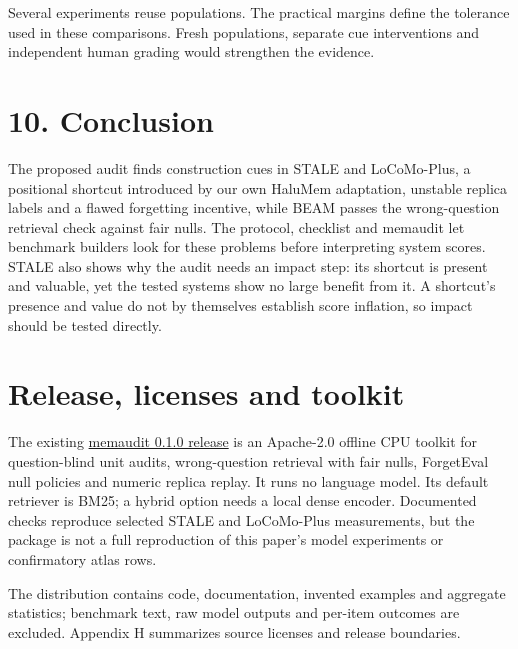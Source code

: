 \documentclass[11pt]{article}
\begin{document}
Several experiments reuse populations. The practical margins define the tolerance used in these comparisons. Fresh populations, separate cue interventions and independent human grading would strengthen the evidence.

\label{main-10}

\section{10. Conclusion}\label{conclusion}

The proposed audit finds construction cues in STALE and LoCoMo-Plus, a positional shortcut introduced by our own HaluMem adaptation, unstable replica labels and a flawed forgetting incentive, while BEAM passes the wrong-question retrieval check against fair nulls. The protocol, checklist and memaudit let benchmark builders look for these problems before interpreting system scores. STALE also shows why the audit needs an impact step: its shortcut is present and valuable, yet the tested systems show no large benefit from it. A shortcut's presence and value do not by themselves establish score inflation, so impact should be tested directly.

\label{main-release}

\section*{Release, licenses and toolkit}\label{release-licenses-and-toolkit}

The existing \href{https://github.com/ozgurugurlu/memaudit}{memaudit 0.1.0 release} is an Apache-2.0 offline CPU toolkit for question-blind unit audits, wrong-question retrieval with fair nulls, ForgetEval null policies and numeric replica replay. It runs no language model. Its default retriever is BM25; a hybrid option needs a local dense encoder. Documented checks reproduce selected STALE and LoCoMo-Plus measurements, but the package is not a full reproduction of this paper's model experiments or confirmatory atlas rows.

The distribution contains code, documentation, invented examples and aggregate statistics; benchmark text, raw model outputs and per-item outcomes are excluded. Appendix H summarizes source licenses and release boundaries.

\clearpage


\end{document}
